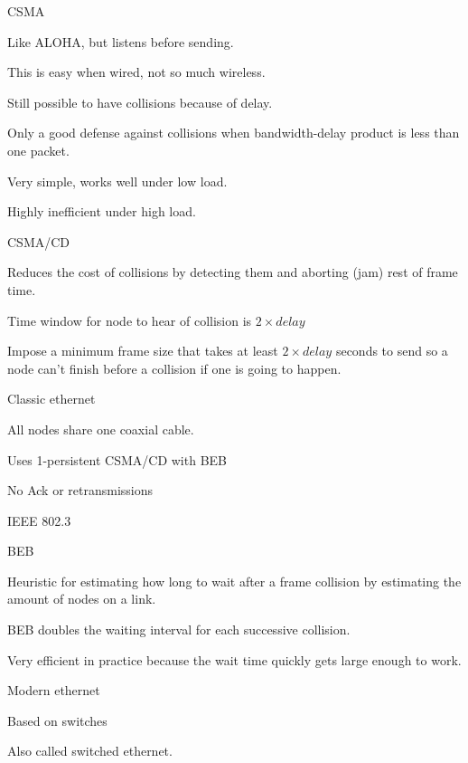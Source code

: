 \documentclass[main.tex]{subfiles}
\begin{document}
\begin{card}{CSMA}
\item Like ALOHA, but listens before sending.
\item This is easy when wired, not so much wireless.
\item Still possible to have collisions because of delay.
\item Only a good defense against collisions when bandwidth-delay product is less than one packet.
\item Very simple, works well under low load.
\item Highly inefficient under high load.
\end{card}

\begin{card}{CSMA/CD}
\item Reduces the cost of collisions by detecting them and aborting (jam) rest of frame time.
\item Time window for node to hear of collision is $2\times delay$
\item Impose a minimum frame size that takes at least $2\times delay$ seconds to send so a node can't finish before a collision if one is going to happen.
\end{card}

\begin{card}{Classic ethernet}
\item All nodes share one coaxial cable.
\item Uses 1-persistent CSMA/CD with BEB
\item No Ack or retransmissions
\item IEEE 802.3
\end{card}

\begin{card}{BEB}
\item Heuristic for estimating how long to wait after a frame collision by estimating the amount of nodes on a link.
\item BEB doubles the waiting interval for each successive collision.
\item Very efficient in practice because the wait time quickly gets large enough to work.
\end{card}

\full{}
\begin{card}{Modern ethernet}
\item Based on switches
\item Also called switched ethernet.
\end{card}
\end{document}
